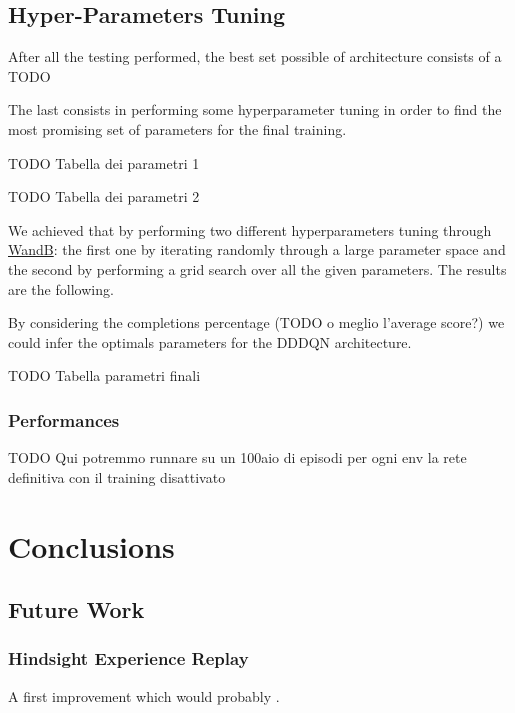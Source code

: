 \documentclass[12pt]{article}
\begin{document}
\subsection{Hyper-Parameters Tuning}

After all the testing performed, the best set possible of architecture consists of a TODO

The last consists in performing some hyperparameter tuning in order to find the most promising set of parameters for the final training.

TODO Tabella dei parametri 1

TODO Tabella dei parametri 2

We achieved that by performing two different hyperparameters tuning through \hyperlink{https://wandb.ai/}{WandB}: the first one by iterating randomly through a large parameter space and the second by performing a grid search over all the given parameters. The results are the following. 

By considering the completions percentage (TODO o meglio l'average score?) we could infer the optimals parameters for the DDDQN architecture.

TODO Tabella parametri finali

\subsubsection{Performances}

TODO Qui potremmo runnare su un 100aio di episodi per ogni env la rete definitiva con il training disattivato

\section{Conclusions}

\subsection{Future Work}

\subsubsection{Hindsight Experience Replay}

A first improvement which would probably \cite{her}.
\end{document}
